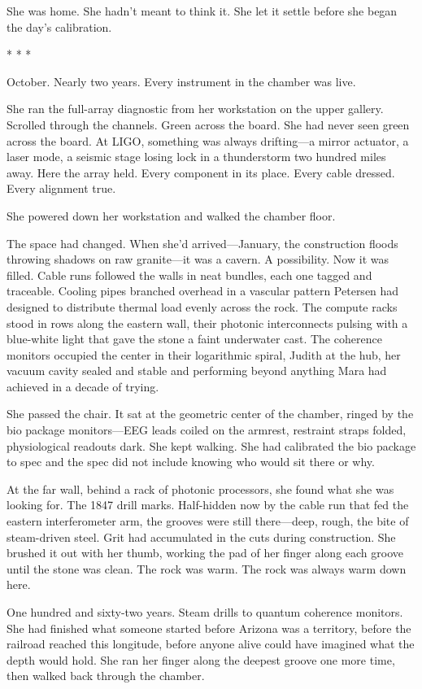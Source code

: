 \documentclass[12pt]{article}
\newcommand{\scenebreak}{\begin{center}* * *\end{center}}
\begin{document}
She was home. She hadn't meant to think it. She let it settle before she began the day's calibration.

\scenebreak

October. Nearly two years. Every instrument in the chamber was live.

She ran the full-array diagnostic from her workstation on the upper gallery. Scrolled through the channels. Green across the board. She had never seen green across the board. At LIGO, something was always drifting---a mirror actuator, a laser mode, a seismic stage losing lock in a thunderstorm two hundred miles away. Here the array held. Every component in its place. Every cable dressed. Every alignment true.

She powered down her workstation and walked the chamber floor.

The space had changed. When she'd arrived---January, the construction floods throwing shadows on raw granite---it was a cavern. A possibility. Now it was filled. Cable runs followed the walls in neat bundles, each one tagged and traceable. Cooling pipes branched overhead in a vascular pattern Petersen had designed to distribute thermal load evenly across the rock. The compute racks stood in rows along the eastern wall, their photonic interconnects pulsing with a blue-white light that gave the stone a faint underwater cast. The coherence monitors occupied the center in their logarithmic spiral, Judith at the hub, her vacuum cavity sealed and stable and performing beyond anything Mara had achieved in a decade of trying.

She passed the chair. It sat at the geometric center of the chamber, ringed by the bio package monitors---EEG leads coiled on the armrest, restraint straps folded, physiological readouts dark. She kept walking. She had calibrated the bio package to spec and the spec did not include knowing who would sit there or why.

At the far wall, behind a rack of photonic processors, she found what she was looking for. The 1847 drill marks. Half-hidden now by the cable run that fed the eastern interferometer arm, the grooves were still there---deep, rough, the bite of steam-driven steel. Grit had accumulated in the cuts during construction. She brushed it out with her thumb, working the pad of her finger along each groove until the stone was clean. The rock was warm. The rock was always warm down here.

One hundred and sixty-two years. Steam drills to quantum coherence monitors. She had finished what someone started before Arizona was a territory, before the railroad reached this longitude, before anyone alive could have imagined what the depth would hold. She ran her finger along the deepest groove one more time, then walked back through the chamber.
\end{document}
